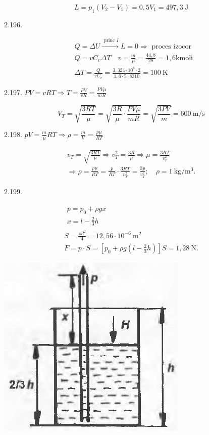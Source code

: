 $$
L=p_{1}\left(V_{2}-V_{1}\right)=0,5 V_{1}=497,3 \mathrm{~J}
$$

2.196.

$$
\begin{aligned}
& Q=\Delta U \xrightarrow{\text { princ } I} L=0 \Rightarrow \text { proces izocor } \\
& Q=v C_{v} \Delta T \quad v=\frac{m}{\mu}=\frac{44,8}{28}=1,6 \mathrm{kmoli} \\
& \Delta T=\frac{Q}{v C_{v}}=\frac{3,324 \cdot 10^{6} \cdot 2}{1,6 \cdot 5 \cdot 8310}=100 \mathrm{~K}
\end{aligned}
$$

2.197. $P V=v R T \Rightarrow T=\frac{P V}{v R}=\frac{P V \mu}{m R}$

$$
V_{T}=\sqrt{\frac{3 R T}{\mu}}=\sqrt{\frac{3 R}{\mu} \cdot \frac{P V \mu}{m R}}=\sqrt{\frac{3 P V}{m}}=600 \mathrm{~m} / \mathrm{s}
$$

2.198. $p V=\frac{m}{\mu} R T \Rightarrow \rho=\frac{m}{V}=\frac{p \mu}{R T}$

$$
\begin{gathered}
v_{T}=\sqrt{\frac{3 R T}{\mu}} \Rightarrow v_{T}^{2}=\frac{3 R}{\mu} \Rightarrow \mu=\frac{3 R T}{v_{T}^{2}} \\
\Rightarrow \rho=\frac{p \mu}{R T}=\frac{p}{R T} \cdot \frac{3 R T}{v_{T}^{2}}=\frac{3 p}{v_{T}^{2}} ; \quad \rho=1 \mathrm{~kg} / \mathrm{m}^{3} .
\end{gathered}
$$

2.199.

$$
\begin{gathered}
\begin{array}{c}
p=p_{0}+\rho g x \\
x=l-\frac{2}{3} h
\end{array} \\
S=\frac{\pi d^{2}}{4}=12,56 \cdot 10^{-6} \mathrm{~m}^{2} \\
F=p \cdot S=\left[p_{0}+\rho g\left(l-\frac{2}{3} h\right)\right] S=1,28 \mathrm{~N} .
\end{gathered}
$$

\begin{center}
\includegraphics[width=0.4\linewidth]{images/2025_07_01_5b3ff9fa0d508c8e9f17g-313}
\end{center}

